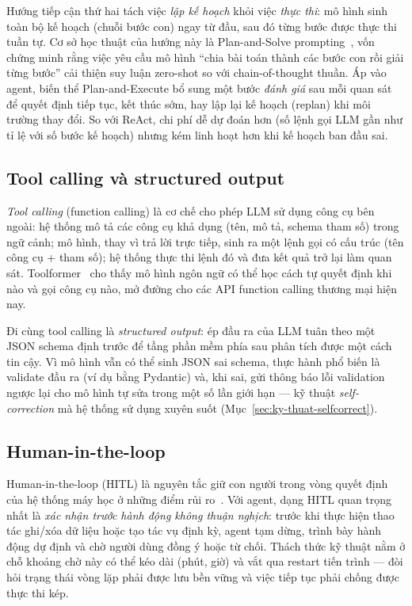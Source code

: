 Hướng tiếp cận thứ hai tách việc \emph{lập kế hoạch} khỏi việc \emph{thực
thi}: mô hình sinh toàn bộ kế hoạch (chuỗi bước con) ngay từ đầu, sau đó từng
bước được thực thi tuần tự. Cơ sở học thuật của hướng này là Plan-and-Solve
prompting~\cite{wang2023planandsolve}, vốn chứng minh rằng việc yêu cầu mô
hình ``chia bài toán thành các bước con rồi giải từng bước'' cải thiện suy
luận zero-shot so với chain-of-thought thuần. Áp vào agent, biến thể
Plan-and-Execute bổ sung một bước \emph{đánh giá} sau mỗi quan sát để quyết
định tiếp tục, kết thúc sớm, hay lập lại kế hoạch (replan) khi môi trường
thay đổi. So với ReAct, chi phí dễ dự đoán hơn (số lệnh gọi LLM gần như tỉ lệ
với số bước kế hoạch) nhưng kém linh hoạt hơn khi kế hoạch ban đầu sai.

\subsection{Tool calling và structured output}

\emph{Tool calling} (function calling) là cơ chế cho phép LLM sử dụng công cụ
bên ngoài: hệ thống mô tả các công cụ khả dụng (tên, mô tả, schema tham số)
trong ngữ cảnh; mô hình, thay vì trả lời trực tiếp, sinh ra một lệnh gọi có
cấu trúc (tên công cụ + tham số); hệ thống thực thi lệnh đó và đưa kết quả
trở lại làm quan sát. Toolformer~\cite{schick2023toolformer} cho thấy mô hình
ngôn ngữ có thể học cách tự quyết định khi nào và gọi công cụ nào, mở đường
cho các API function calling thương mại hiện nay.

Đi cùng tool calling là \emph{structured output}: ép đầu ra của LLM tuân theo
một JSON schema định trước để tầng phần mềm phía sau phân tích được một cách
tin cậy. Vì mô hình vẫn có thể sinh JSON sai schema, thực hành phổ biến là
validate đầu ra (ví dụ bằng Pydantic) và, khi sai, gửi thông báo lỗi
validation ngược lại cho mô hình tự sửa trong một số lần giới hạn ---
kỹ thuật \emph{self-correction} mà hệ thống sử dụng xuyên suốt
(Mục~\ref{sec:ky-thuat-selfcorrect}).

\subsection{Human-in-the-loop}

Human-in-the-loop (HITL) là nguyên tắc giữ con người trong vòng quyết định
của hệ thống máy học ở những điểm rủi ro~\cite{wu2022hitl}. Với agent, dạng
HITL quan trọng nhất là \emph{xác nhận trước hành động không thuận nghịch}:
trước khi thực hiện thao tác ghi/xóa dữ liệu hoặc tạo tác vụ định kỳ, agent
tạm dừng, trình bày hành động dự định và chờ người dùng đồng ý hoặc từ chối.
Thách thức kỹ thuật nằm ở chỗ khoảng chờ này có thể kéo dài (phút, giờ) và
vắt qua restart tiến trình --- đòi hỏi trạng thái vòng lặp phải được lưu bền
vững và việc tiếp tục phải chống được thực thi kép.

